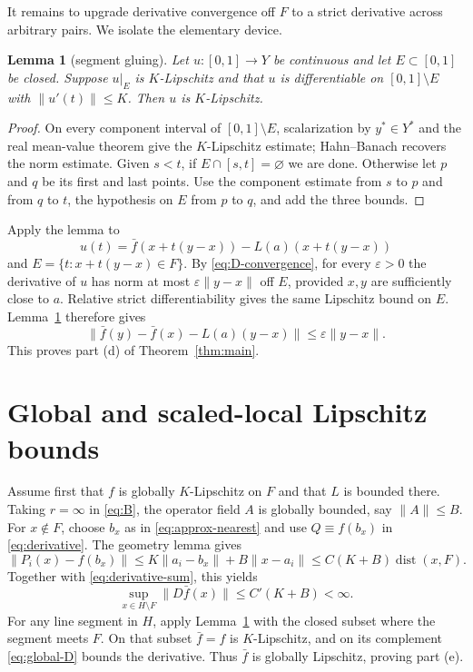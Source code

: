 \documentclass[11pt]{article}
\newtheorem{lemma}{Lemma}
\newcommand{\dist}{\operatorname{dist}}
\begin{document}
It remains to upgrade derivative convergence off $F$ to a strict derivative
across arbitrary pairs.  We isolate the elementary device.

\begin{lemma}[segment gluing]\label{lem:segment}
Let $u:[0,1]\to Y$ be continuous and let $E\subset[0,1]$ be closed.  Suppose
$u|_E$ is $K$-Lipschitz and that $u$ is differentiable on
$[0,1]\setminus E$ with $\|u'(t)\|\le K$.  Then $u$ is $K$-Lipschitz.
\end{lemma}

\begin{proof}
On every component interval of $[0,1]\setminus E$, scalarization by
$y^*\in Y^*$ and the real mean-value theorem give the $K$-Lipschitz estimate;
Hahn--Banach recovers the norm estimate.  Given $s<t$, if
$E\cap[s,t]=\varnothing$ we are done.  Otherwise let $p$ and $q$ be its first
and last points.  Use the component estimate from $s$ to $p$ and from $q$ to
$t$, the hypothesis on $E$ from $p$ to $q$, and add the three bounds.
\end{proof}

Apply the lemma to
\[
 u(t)=\bar f(x+t(y-x))-L(a)(x+t(y-x))
\]
and $E=\{t:x+t(y-x)\in F\}$.  By \eqref{eq:D-convergence}, for every
$\varepsilon>0$ the derivative of $u$ has norm at most
$\varepsilon\|y-x\|$ off $E$, provided $x,y$ are sufficiently close to $a$.
Relative strict differentiability gives the same Lipschitz bound on $E$.
Lemma~\ref{lem:segment} therefore gives
\[
 \|\bar f(y)-\bar f(x)-L(a)(y-x)\|
 \le\varepsilon\|y-x\|.
\]
This proves part (d) of Theorem~\ref{thm:main}.

\section{Global and scaled-local Lipschitz bounds}

Assume first that $f$ is globally $K$-Lipschitz on $F$ and that $L$ is
bounded there.  Taking $r=\infty$ in \eqref{eq:B}, the operator field $A$ is
globally bounded, say $\|A\|\le B$.  For $x\notin F$, choose $b_x$ as in
\eqref{eq:approx-nearest} and use $Q\equiv f(b_x)$ in
\eqref{eq:derivative}.  The geometry lemma gives
\[
 \|P_i(x)-f(b_x)\|
 \le K\|a_i-b_x\|+B\|x-a_i\|
 \le C(K+B)\dist(x,F).
\]
Together with \eqref{eq:derivative-sum}, this yields
\begin{equation}
 \sup_{x\in H\setminus F}\|D\bar f(x)\|
 \le C'(K+B)<\infty.
 \label{eq:global-D}
\end{equation}
For any line segment in $H$, apply Lemma~\ref{lem:segment} with the closed
subset where the segment meets $F$.  On that subset $\bar f=f$ is
$K$-Lipschitz, and on its complement \eqref{eq:global-D} bounds the
derivative.  Thus $\bar f$ is globally Lipschitz, proving part (e).
\end{document}
